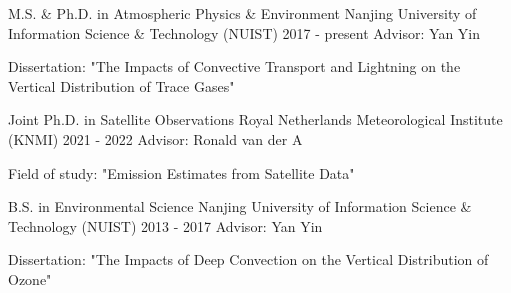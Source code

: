 

\begin{cventries}

  \cventry
    {M.S. \& Ph.D. in Atmospheric Physics \& Environment} %
    {Nanjing University of Information Science \& Technology (NUIST)} %
    {2017 - present} %
    {Advisor: Yan Yin} %
    {
      \begin{cvitems} %
        \item {Dissertation: "The Impacts of Convective Transport and Lightning on the Vertical Distribution of Trace Gases"}
      \end{cvitems}
    }

  \cventry
    {Joint Ph.D. in Satellite Observations} %
    {Royal Netherlands Meteorological Institute (KNMI)} %
    {2021 - 2022} %
    {Advisor: Ronald van der A} %
    {
      \begin{cvitems} %
        \item {Field of study: "Emission Estimates from Satellite Data"}
      \end{cvitems}
    }

  \cventry
    {B.S. in Environmental Science} %
    {Nanjing University of Information Science \& Technology (NUIST)} %
    {2013 - 2017} %
    {Advisor: Yan Yin} %
    {
      \begin{cvitems} %
        \item {Dissertation: "The Impacts of Deep Convection on the Vertical Distribution of Ozone"}
      \end{cvitems}
    }


\end{cventries}
